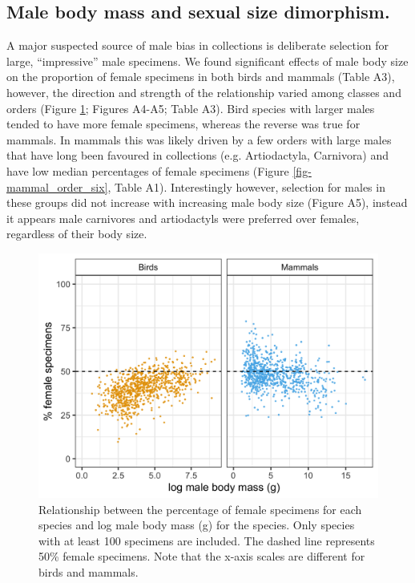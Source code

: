 \documentclass[a4paper, 12pt]{article}
\begin{document}
\subsection{Male body mass and sexual size dimorphism.}
A major suspected source of male bias in collections is deliberate selection for large, ``impressive'' male specimens. 
We found significant effects of male body size on the proportion of female specimens in both birds and mammals (Table A3), however, the direction and strength of the relationship varied among classes and orders (Figure \ref{fig-male-mass}; Figures A4-A5; Table A3). 
Bird species with larger males tended to have more female specimens, whereas the reverse was true for mammals. 
In mammals this was likely driven by a few orders with large males that have long been favoured in collections (e.g. Artiodactyla, Carnivora) and have low median percentages of female specimens (Figure \ref{fig-mammal_order_six}, Table A1). 
Interestingly however, selection for males in these groups did not increase with increasing male body size (Figure A5), instead it appears male carnivores and artiodactyls were preferred over females, regardless of their body size.

\begin{figure}
 \centering
  \includegraphics[width = \linewidth]{figures/male-mass-all.png}
  \caption{Relationship between the percentage of female specimens for each species and log male body mass (g) for the species. 
  Only species with at least 100 specimens are included. 
  The dashed line represents 50\% female specimens. 
  Note that the x-axis scales are different for birds and mammals.
}
  \label{fig-male-mass}
\end{figure}
\end{document}
